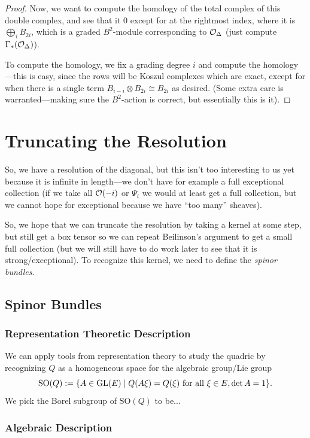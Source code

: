 \documentclass[12pt]{article}
\begin{document}
\begin{proof}
    Now, we want to compute the homology of the total complex of this double complex, and see that it 0 except for at the rightmost index, where it is $\bigoplus_i B_{2i}$, which is a graded $B^2$-module corresponding to $\mathcal{O}_\Delta$ (just compute $\Gamma_*(\mathcal{O}_\Delta)$).

    To compute the homology, we fix a grading degree $i$ and compute the homology---this is easy, since the rows will be Koszul complexes which are exact, except for when there is a single term $B_{i-i}\otimes B_{2i} \cong B_{2i}$ as desired. (Some extra care is warranted---making sure the $B^2$-action is correct, but essentially this is it).
\end{proof}

\section{Truncating the Resolution}

So, we have a resolution of the diagonal, but this isn't too interesting to us yet because it is infinite in length---we don't have for example a full exceptional collection (if we take all $\mathcal{O}(-i)$ or $\Psi_i$ we would at least get a full collection, but we cannot hope for exceptional because we have ``too many'' sheaves).

So, we hope that we can truncate the resolution by taking a kernel at some step, but still get a box tensor so we can repeat Beilinson's argument to get a small full collection (but we will still have to do work later to see that it is strong/exceptional). To recognize this kernel, we need to define the \textit{spinor bundles}.

\subsection{Spinor Bundles}

\subsubsection{Representation Theoretic Description}

We can apply tools from representation theory to study the quadric by recognizing $Q$ as a homogeneous space for the algebraic group/Lie group
\[\mathrm{SO}(Q) := \{A\in \mathrm{GL}(E) \mid Q(A\xi) = Q(\xi) \text{ for all } \xi \in E, \det A = 1\}.\]
We pick the Borel subgroup of $\mathrm{SO}(Q)$ to be...

\subsubsection{Algebraic Description}
\end{document}
